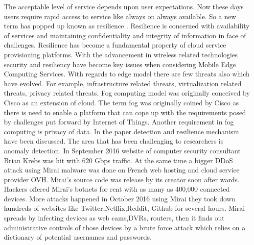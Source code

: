 The acceptable level of service depends upon user expectations. Now these days users require rapid access to service like always on always available. So a new term has popped up known as resilience \cite{shirazi2017extended}. Resilience is concerned with availability of services and maintaining confidentiality and integrity of information in face of challenges. Resilience has become a fundamental property of cloud service provisioning platforms. With the advancement in wireless related technologies security and resiliency have become key issues when considering Mobile Edge Computing Services. With regards to edge model there are few threats also which have evolved. For example, infrastructure related threats, virtualization related threats, privacy related threats.
Fog computing model was originally conceived by Cisco as an extension of cloud. The term fog was originally coined by Cisco as there is need to enable a platform that can cope up with the requirements posed by challenges put forward by Internet of Things. Another requirement in fog computing is privacy of data. In the paper detection and resilience mechanism have been discussed. 
The area that has been challenging to researchers is anomaly detection.
In September 2016 \cite{kolias2017ddos} website of computer security consultant Brian Krebs was hit with 620 Gbps traffic. At the same time a bigger DDoS attack using Mirai malware was done on French web hosting and cloud service provider OVH. Mirai’s source code was release by its creator soon after wards. Hackers offered Mirai’s botnets for rent with as many as 400,000 connected devices. More attacks happened in October 2016 using Mirai they took down hundreds of websites like Twitter,Netflix,Reddit, Github for several hours. Mirai spreads by infecting devices as web cams,DVRs, routers, then it finds out administrative controls of those devices by a brute force attack which relies on a dictionary of potential usernames and passwords.





